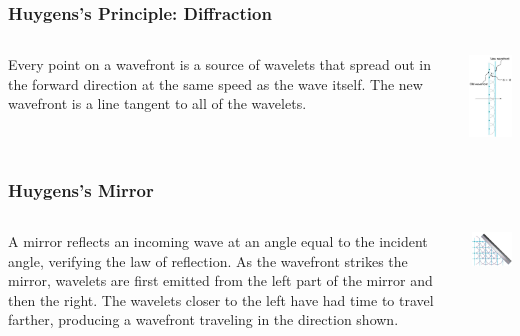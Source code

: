 \documentclass{beamer}
\begin{document}
\begin{frame}\frametitle{Huygens's Principle: Diffraction}
\begin{columns}
\begin{column}{7cm}
Every point on a wavefront is a source of wavelets that spread out in the forward direction at the same speed as the wave itself. The new wavefront is a line tangent to all of the wavelets.
\end{column}
\begin{column}{4cm}
\begin{center}
\includegraphics[width=3cm]{fig/huygens.jpg}
\end{center}
\end{column}
\end{columns}
\end{frame}

\begin{frame}\frametitle{Huygens's Mirror}
\begin{columns}
\begin{column}{6cm}
A mirror reflects an incoming wave at an angle equal to the incident angle, verifying the law of reflection. As the wavefront strikes the mirror, wavelets are first emitted from the left part of the mirror and then the right. The wavelets closer to the left have had time to travel farther, producing a wavefront traveling in the direction shown.
\end{column}
\begin{column}{5cm}
\begin{center}
\includegraphics[width=5cm]{fig/huyMirror.jpg}
\end{center}
\end{column}
\end{columns}
\end{frame}
\end{document}
